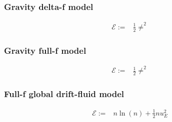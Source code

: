 \subsubsection{Gravity delta-f model}
\begin{align}
 \mathcal{E} := &
 \frac{1}{2} \ne^2
\end{align}

\subsubsection{Gravity full-f model}
\begin{align}
 \mathcal{E} := &
 \frac{1}{2} \ne^2
\end{align}

\subsubsection{Full-f global drift-fluid model}
\begin{align}
 \mathcal{E} := & n \ln ( n) + \frac{1}{2} n u_E^2
\end{align}






